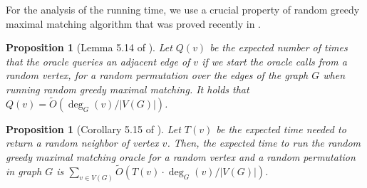 \documentclass[letterpaper,11pt]{article}
\newcommand{\wt}[1]{\ensuremath{\widetilde{#1}}}
\newtheorem{proposition}[lemma]{Proposition}
\begin{document}
For the analysis of the running time, we use a crucial property of random greedy maximal matching algorithm that was proved recently in \cite{steiner-tree-itcs}.



\begin{proposition}[Lemma 5.14 of \cite{steiner-tree-itcs}]\label{prop:outdegree-bound-1}
    Let $Q(v)$ be the expected number of times that the oracle queries an adjacent edge of $v$ if we start the oracle calls from a random vertex, for a random permutation over the edges of the graph $G$ when running random greedy maximal matching. It holds that $Q(v) = \wt{O}(\deg_G(v) / |V(G)|)$.
\end{proposition}



\begin{proposition}[Corollary 5.15 of \cite{steiner-tree-itcs}]\label{prop:outdegree-bound}
    Let $T(v)$ be the expected time needed to return a random neighbor of vertex $v$. Then, the expected time to run the random greedy maximal matching oracle for a random vertex and a random permutation in graph $G$ is $\sum_{v \in V(G)} \wt{O}(T(v) \cdot \deg_G(v) / |V(G)|)$.
\end{proposition}
\end{document}
